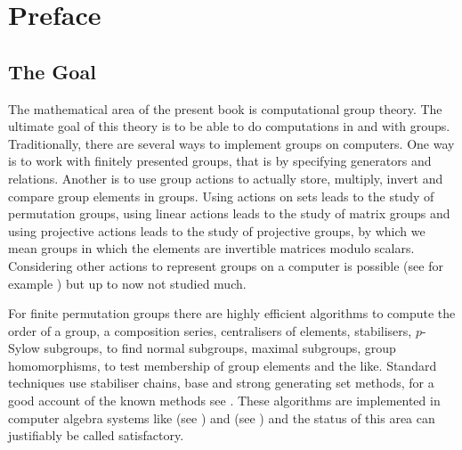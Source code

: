 
\chapter*{Preface}

\renewcommand{\thechapter}{0}


\section*{The Goal}

The mathematical area of the present book is computational group
theory. The ultimate goal of this theory is to be able to do
computations in and with groups. Traditionally, there are several ways
to implement groups on computers. One way is to work with finitely
presented groups, that is by specifying generators and relations.
Another is to use group actions to actually store,
multiply, invert and compare group elements in groups. Using 
actions on sets leads to the study of permutation groups, using linear
actions leads to the study of matrix groups and using projective
actions leads to the study of projective groups, by which we mean
groups in which the elements are invertible matrices modulo scalars.
Considering other actions to represent groups on a computer is
possible (see for example \cite{Kohl}) but up to now not studied much.

For finite permutation groups there are highly efficient
algorithms to compute the order of a group, a composition series,
centralisers of elements, stabilisers, $p$-Sylow subgroups, to find
normal subgroups, maximal subgroups, group homomorphisms, to test
membership of group elements and the like.
Standard techniques use stabiliser chains, base and strong generating
set methods, for a good account of the known methods see \cite{Ser}. 
These algorithms are implemented in computer algebra
systems like {\GAP} (see \cite{GAP4}) and {\MAGMA} (see \cite{Magma})
and the status of this area can justifiably be called satisfactory.

